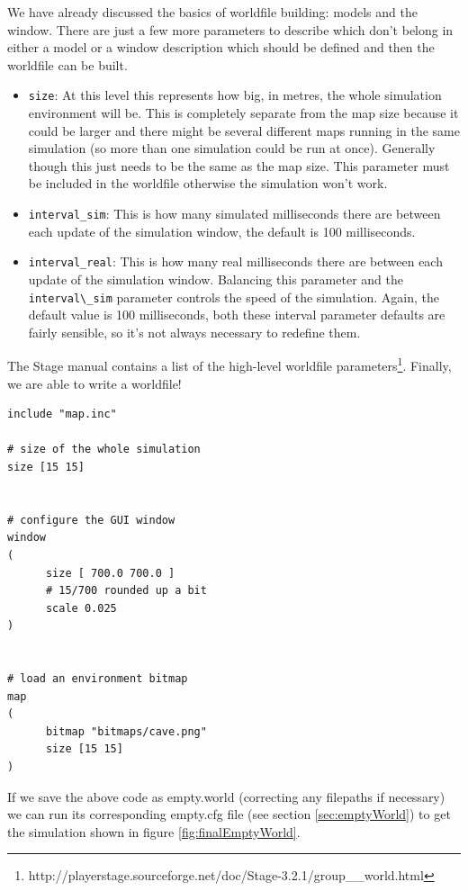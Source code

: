 \documentclass[a4paper]{report}
\begin{document}
We have already discussed the basics of worldfile building: models and the window. There are just a few more parameters to describe which don't belong in either a model or a window description which should be defined and then the worldfile can be built.
\begin{itemize}
\item \verb|size|: At this level this represents how big, in metres, the whole simulation environment will be. This is completely separate from the map size because it could be larger and there might be several different maps running in the same simulation (so more than one simulation could be run at once). Generally though this just needs to be the same as the map size. This parameter must be included in the worldfile otherwise the simulation won't work.
\item \verb|interval_sim|: This is how many simulated milliseconds there are between each update of the simulation window, the default is 100 milliseconds.
\item \verb|interval_real|: This is how many real milliseconds there are between each update of the simulation window. Balancing this parameter and the \verb|interval\_sim| parameter controls the speed of the simulation. Again, the default value is 100 milliseconds, both these interval parameter defaults are fairly sensible, so it's not always necessary to redefine them.
\end{itemize}
The Stage manual contains a list of the high-level worldfile parameters\footnote{http://playerstage.sourceforge.net/doc/Stage-3.2.1/group\_\_world.html}.\newline
Finally, we are able to write a worldfile!
\begin{verbatim}
include "map.inc"

# size of the whole simulation
size [15 15]


# configure the GUI window
window
( 
      size [ 700.0 700.0 ] 
      # 15/700 rounded up a bit
	  scale 0.025
)


# load an environment bitmap
map
(
      bitmap "bitmaps/cave.png"
      size [15 15]	
)
\end{verbatim}
If we save the above code as empty.world (correcting any filepaths if necessary) we can run its corresponding empty.cfg file (see section \ref{sec:emptyWorld}) to get the simulation shown in figure \ref{fig:finalEmptyWorld}.
\end{document}
